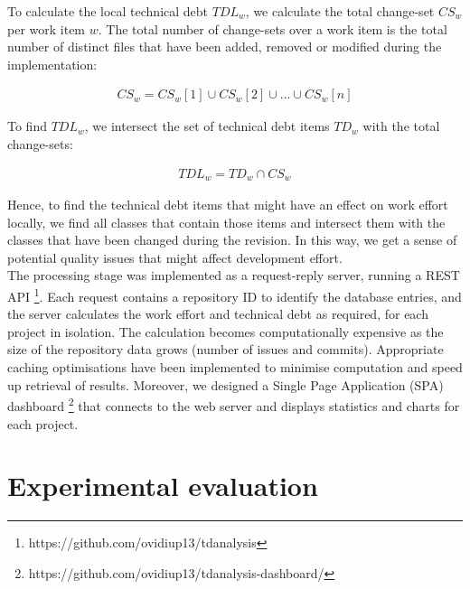 \documentclass{mpaper}
\begin{document}
To calculate the local technical debt $TDL_{w}$, we calculate the total
change-set $CS_{w}$ per work item $w$. The total number of change-sets over a
work item is the total number of distinct files that have been added, removed or
modified during the implementation:

\begin{equation}
  \label{eq-td-changes}
  \begin{aligned}
    CS_{w} = CS_{w}[1] \cup CS_{w}[2] \cup ... \cup CS_{w}[n]
  \end{aligned}
\end{equation}

To find $TDL_{w}$, we intersect the set of technical debt items $TD_{w}$ with
the total change-sets:

\begin{equation}
  \label{eq-td-local}
  \begin{aligned}
    TDL_{w} = TD_{w} \cap CS_{w}
  \end{aligned}
\end{equation}

Hence, to find the technical debt items that might have an effect on work effort
locally, we find all classes that contain those items and intersect them with
the classes that have been changed during the revision. In this way, we get a
sense of potential quality issues that might affect development effort.\\

The processing stage was implemented as a request-reply server, running a REST
API \footnote{https://github.com/ovidiup13/tdanalysis}. Each request contains a
repository ID to identify the database entries, and the server calculates the
work effort and technical debt as required, for each project in isolation. The
calculation becomes computationally expensive as the size of the repository data
grows (number of issues and commits). Appropriate caching optimisations have
been implemented to minimise computation and speed up retrieval of results.
Moreover, we designed a Single Page Application (SPA) dashboard
\footnote{https://github.com/ovidiup13/tdanalysis-dashboard/} that connects to
the web server and displays statistics and charts for each project.


\section{Experimental evaluation}
\label{evaluation}
\end{document}
